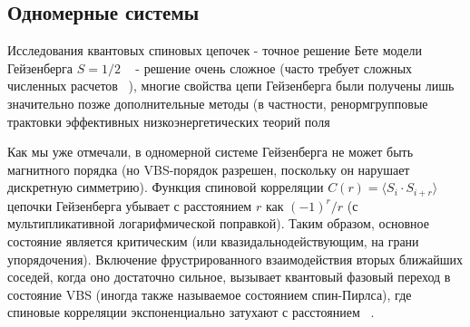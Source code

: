 \documentclass[11pt]{article}
\begin{document}
\subsection{Одномерные системы}
Исследования квантовых спиновых цепочек - точное решение Бете модели Гейзенберга $S = 1/2$ ~\cite{ph_71} - решение очень сложное (часто требует сложных численных расчетов ~\cite{sm_2006, mp_59_091417}), многие свойства цепи Гейзенберга были получены лишь значительно позже дополнительные методы (в частности, ренормгрупповые трактовки эффективных низкоэнергетических теорий поля ~\cite{prl_50_1153, prl_55_1355, mpa_22_511, mpa_22_2562, prb_39_4620}

Как мы уже отмечали, в одномерной системе Гейзенберга не может быть магнитного порядка (но VBS-порядок разрешен, поскольку он нарушает дискретную симметрию). Функция спиновой корреляции $C(r) = \langle  S_i · S_{i + r} \rangle$ цепочки Гейзенберга убывает с расстоянием $r$ как $(−1)^r/ r$ (с мультипликативной логарифмической поправкой). Таким образом, основное состояние является критическим (или квазидальнодействующим, на грани упорядочения). Включение фрустрированного взаимодействия вторых ближайших соседей, когда оно достаточно сильное, вызывает квантовый фазовый переход в состояние VBS (иногда также называемое состоянием спин-Пирлса), где спиновые корреляции экспоненциально затухают с расстоянием ~\cite{mp_10_1388}.
\end{document}
